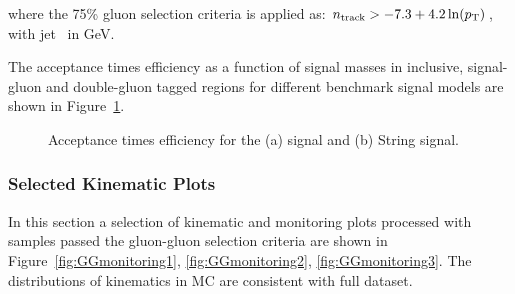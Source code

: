 \noindent
where the 75\% gluon selection criteria is applied as: $n_\mathrm{track} > -7.3 +
4.2\ln(p_{\mathrm{T}})$, with jet \pt\ in GeV.


\FloatBarrier

The acceptance times efficiency as a function of signal masses in inclusive, signal-gluon and double-gluon
tagged regions for different benchmark signal models are shown in Figure~\ref{fig:AccxEff}.

\begin{figure}[htb]
 \centering
 \caption{Acceptance times efficiency for the (a) \Hprime signal and (b) String signal.}
 \label{fig:AccxEff}
\end{figure}
\FloatBarrier
\subsubsection{Selected Kinematic Plots}

In this section a selection of kinematic and monitoring plots processed with samples passed the gluon-gluon selection criteria are shown in Figure~\ref{fig:GGmonitoring1}, \ref{fig:GGmonitoring2}, \ref{fig:GGmonitoring3}. The distributions of kinematics in MC are consistent with full dataset.

